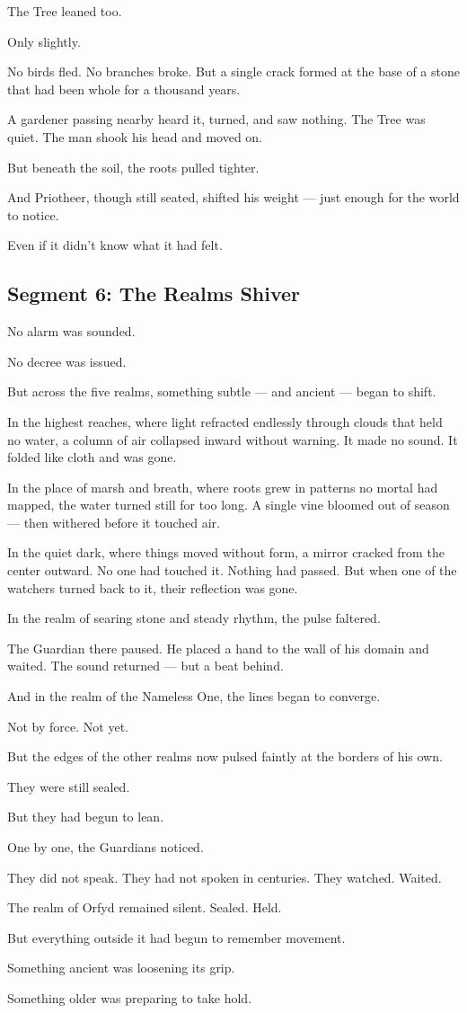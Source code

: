 \documentclass[9pt]{article}
\begin{document}
The Tree leaned too.

Only slightly.

No birds fled. No branches broke. But a single crack formed at the base of a stone that had been whole for a thousand years.

A gardener passing nearby heard it, turned, and saw nothing. The Tree was quiet. The man shook his head and moved on.

But beneath the soil, the roots pulled tighter.

And Priotheer, though still seated, shifted his weight — just enough for the world to notice.

Even if it didn’t know what it had felt.



\newpage

\subsection*{Segment 6: The Realms Shiver}

No alarm was sounded.

No decree was issued.

But across the five realms, something subtle — and ancient — began to shift.

In the highest reaches, where light refracted endlessly through clouds that held no water, a column of air collapsed inward without warning. It made no sound. It folded like cloth and was gone.

In the place of marsh and breath, where roots grew in patterns no mortal had mapped, the water turned still for too long. A single vine bloomed out of season — then withered before it touched air.

In the quiet dark, where things moved without form, a mirror cracked from the center outward. No one had touched it. Nothing had passed. But when one of the watchers turned back to it, their reflection was gone.

In the realm of searing stone and steady rhythm, the pulse faltered.

The Guardian there paused. He placed a hand to the wall of his domain and waited. The sound returned — but a beat behind.

And in the realm of the Nameless One, the lines began to converge.

Not by force. Not yet.

But the edges of the other realms now pulsed faintly at the borders of his own.

They were still sealed.

But they had begun to lean.

One by one, the Guardians noticed.

They did not speak. They had not spoken in centuries. They watched. Waited.

The realm of Orfyd remained silent. Sealed. Held.

But everything outside it had begun to remember movement.

Something ancient was loosening its grip.

Something older was preparing to take hold.



\newpage
\end{document}
